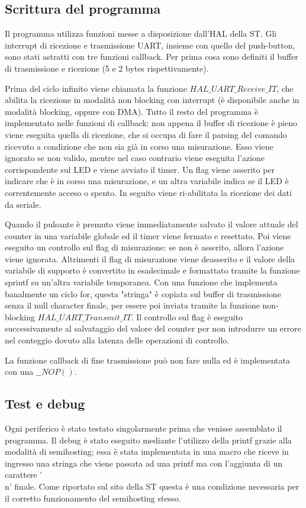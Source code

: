 \documentclass[a4paper]{article}
\begin{document}
	\subsection{Scrittura del programma}
		Il programma utilizza funzioni messe a disposizione dall'HAL della ST. Gli interrupt di ricezione e trasmissione UART, insieme con quello del push-button, sono stati astratti con tre funzioni callback.
		Per prima cosa sono definiti il buffer di trasmissione e ricezione (5 e 2 bytes rispettivamente).
		
		Prima del ciclo infinito viene chiamata la funzione \textbf{$HAL\_UART\_Receive\_IT$}, che abilita la ricezione in modalità non blocking con interrupt (è disponibile anche in modalità blocking, oppure con DMA).
		Tutto il resto del programma è implementato nelle funzioni di callback: non appena il buffer di ricezione è pieno viene eseguita quella di ricezione, che si occupa di fare il parsing del comando ricevuto a condizione che non sia già in corso una misurazione. Esso viene ignorato se non valido, mentre nel caso contrario viene eseguita l'azione corrispondente sul LED e viene avviato il timer. Un flag viene asserito per indicare che è in corso una misurazione, e un altra variabile indica se il LED è correntemente acceso o spento. In seguito viene ri-abilitata la ricezione dei dati da seriale.

		Quando il pulsante è premuto viene immediatamente salvato il valore attuale del counter in una variabile globale ed il timer viene fermato e resettato. Poi viene eseguito un controllo sul flag di misurazione: se non è asserito, allora l'azione viene ignorata. Altrimenti il flag di misurazione viene deasserito e il valore della variabile di supporto è convertito in esadecimale e formattato tramite la funzione sprintf su un'altra variabile temporanea. Con una funzione che implementa banalmente un ciclo for, questa "stringa" è copiata sul buffer di trasmissione senza il null character finale, per essere poi inviata tramite la funzione non-blocking \textbf{$HAL\_UART\_Transmit\_IT$}.
		Il controllo sul flag è eseguito successivamente al salvataggio del valore del counter per non introdurre un errore nel conteggio dovuto alla latenza delle operazioni di controllo.

		La funzione callback di fine trasmissione può non fare nulla ed è implementata con una \textbf{$\_\_NOP()$}.

	\subsection{Test e debug}
		Ogni periferico è stato testato singolarmente prima che venisse assemblato il programma. Il debug è stato eseguito mediante l'utilizzo della printf grazie alla modalità di semihosting; essa è stata implementata in una macro che riceve in ingresso una stringa che viene passata ad una printf ma con l'aggiunta di un carattere '\\n' finale. Come riportato sul sito della ST questa è una condizione necessaria per il corretto funzionamento del semihosting stesso. 
\end{document}
